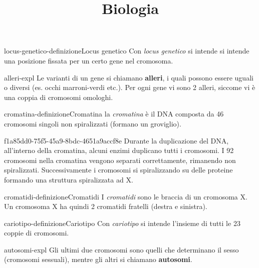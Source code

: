 \documentclass[preview]{standalone}
\begin{document}
\title{Biologia}
\genpage

\begin{snippetdefinition}{locus-genetico-definizione}{Locus genetico}
    Con \textit{locus genetico} si intende si intende una posizione fissata per
    un certo gene nel cromosoma.
\end{snippetdefinition}

\begin{snippet}{alleri-expl}
    Le varianti di un gene si chiamano \textbf{alleri}, i quali possono essere uguali o diversi
    (es. occhi marroni-verdi etc.). Per ogni gene vi sono 2 alleri, siccome vi è una coppia di cromosomi omologhi.
\end{snippet}

\begin{snippetdefinition}{cromatina-definizione}{Cromatina}
    la \textit{cromatina} è il DNA composta da 46 cromosomi singoli non spiralizzati (formano un groviglio).
\end{snippetdefinition}

\begin{snippet}{f1a85dd0-75f5-45a9-8bdc-4651a9accf8e}
    Durante la duplicazione del DNA, all'interno della cromatina,
    alcuni enzimi duplicano tutti i cromosomi.
    I 92 cromosomi nella cromatina vengono separati correttamente, rimanendo non spiralizzati.
    Successivamente i cromosomi si spiralizzando su delle proteine formando una struttura spiralizzata ad X.
\end{snippet}


\begin{snippetdefinition}{cromatidi-definizione}{Cromatidi}
    I \textit{cromatidi} sono le braccia di un cromosoma X.
    Un cromosoma X ha quindi 2 cromatidi fratelli (destra e sinistra).
\end{snippetdefinition}


\begin{snippetdefinition}{cariotipo-definizione}{Cariotipo}
    Con \textit{cariotipo} si intende l'insieme di tutti le 23 coppie di cromosomi.
\end{snippetdefinition}

\begin{snippet}{autosomi-expl}
    Gli ultimi due cromosomi sono quelli che determinano il sesso (cromosomi sessuali),
    mentre gli altri si chiamano \textbf{autosomi}.
\end{snippet}
\end{document}
